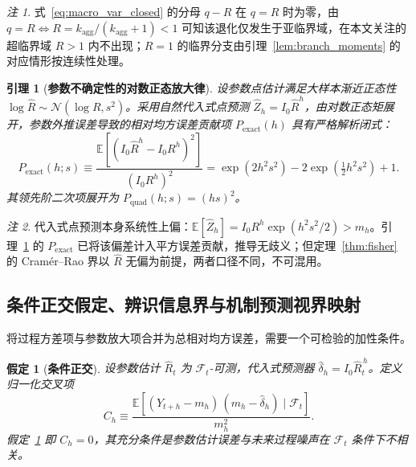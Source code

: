 \documentclass[10pt,UTF8,a4paper,zihao=-4]{ctexart}
\theoremstyle{plain}
\newtheorem{lemma}{引理}
\newtheorem{assumption}{假定}
\theoremstyle{definition}
\theoremstyle{remark}
\newtheorem{remark}{注}
\begin{document}
\begin{remark}\label{rem:degenerate}
式~\eqref{eq:macro_var_closed} 的分母 $q - R$ 在 $q = R$ 时为零，由 $q = R \Leftrightarrow R = k_{\text{agg}}/(k_{\text{agg}}+1) < 1$ 可知该退化仅发生于亚临界域，在本文关注的超临界域 $R > 1$ 内不出现；$R = 1$ 的临界分支由引理~\ref{lem:branch_moments} 的对应情形按连续性处理。
\end{remark}

\begin{lemma}[\textbf{参数不确定性的对数正态放大律}]\label{lem:param_amplification}
设参数点估计满足大样本渐近正态性 $\log\hat{R} \sim \mathcal{N}(\log R, s^2)$。采用自然代入式点预测 $\hat{Z}_h = I_0 \hat{R}^h$，由对数正态矩展开，参数外推误差导致的相对均方误差贡献项 $P_{\text{exact}}(h)$ 具有严格解析闭式：
\begin{equation}
P_{\text{exact}}(h; s) \equiv \frac{\mathbb{E}[(I_0 \hat{R}^h - I_0 R^h)^2]}{(I_0 R^h)^2} = \exp(2 h^2 s^2) - 2\exp(\tfrac{1}{2} h^2 s^2) + 1. \label{eq:param_amplification}
\end{equation}
其领先阶二次项展开为 $P_{\text{quad}}(h; s) = (h s)^2$。
\end{lemma}

\begin{remark}\label{rem:plugin_bias}
代入式点预测本身系统性上偏：$\mathbb{E}[\hat{Z}_h] = I_0 R^h \exp(h^2 s^2/2) > m_h$。引理~\ref{lem:param_amplification} 的 $P_{\text{exact}}$ 已将该偏差计入平方误差贡献，推导无歧义；但定理~\ref{thm:fisher} 的 Cram\'er--Rao 界以 $\hat{R}$ 无偏为前提，两者口径不同，不可混用。
\end{remark}

\subsection{条件正交假定、辨识信息界与机制预测视界映射}\label{sec:horizon_theory}

将过程方差项与参数放大项合并为总相对均方误差，需要一个可检验的加性条件。

\begin{assumption}[\textbf{条件正交}]\label{assump:orthog}
设参数估计 $\hat{R}_t$ 为 $\mathcal{F}_t$-可测，代入式预测器 $\hat{\delta}_h = I_0 \hat{R}_t^{\,h}$。定义归一化交叉项
\begin{equation}
C_h \equiv \frac{\mathbb{E}\left[(Y_{t+h} - m_h)\,(m_h - \hat{\delta}_h) \mid \mathcal{F}_t\right]}{m_h^2}.
\label{eq:cross_term}
\end{equation}
假定~\ref{assump:orthog} 即 $C_h = 0$，其充分条件是参数估计误差与未来过程噪声在 $\mathcal{F}_t$ 条件下不相关。
\end{assumption}
\end{document}
